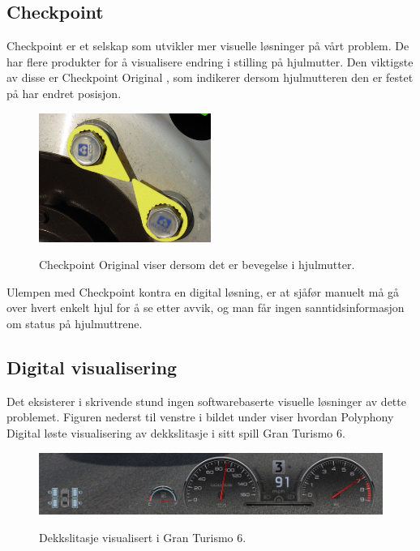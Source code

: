 \subsection{Checkpoint}
Checkpoint er et selskap som utvikler mer visuelle løsninger på vårt problem.
De har flere produkter for å visualisere endring i stilling på hjulmutter. Den 
viktigste av disse er Checkpoint Original \cite{checkpoint1}, 
som indikerer dersom hjulmutteren den er festet på har endret posisjon. 
	\newline
	\begin{figure}[H]
		\centering
		\includegraphics[width=0.50\textwidth]{images/checkpoint-original.jpg}
		\label{fig:checkpoint}
		\caption{Checkpoint Original viser dersom det er bevegelse i hjulmutter.}
	\end{figure}
Ulempen med Checkpoint kontra en digital løsning, er at sjåfør manuelt må gå over 
hvert enkelt hjul for å se etter avvik, og man får ingen sanntidsinformasjon om 
status på hjulmuttrene.

\subsection{Digital visualisering}
Det eksisterer i skrivende stund ingen softwarebaserte visuelle løsninger av dette 
problemet. Figuren nederst til venstre i bildet under viser hvordan  
Polyphony Digital løste visualisering av 
dekkslitasje i sitt spill Gran Turismo 6. \cite{dekkslitasje-GT6} 
	\newline
	\begin{figure}[H]
		\centering
		\includegraphics[width=1.00\textwidth]{images/gran-turismo-6-screenshot.jpg}
		\label{fig:GT6}
		\caption{Dekkslitasje visualisert i Gran Turismo 6.}
	\end{figure}
